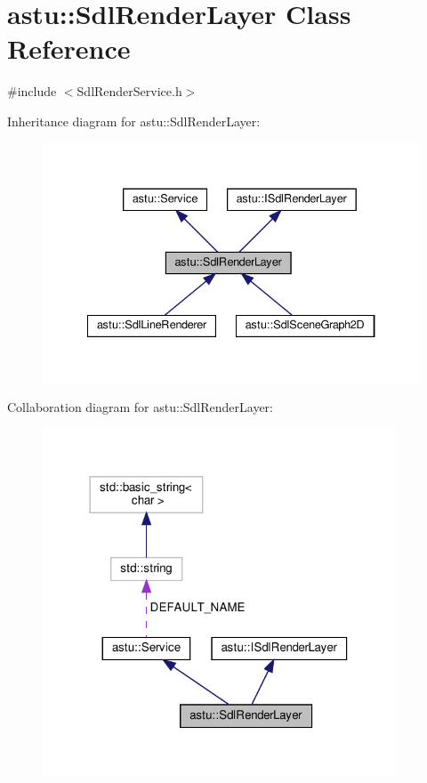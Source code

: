 \hypertarget{classastu_1_1SdlRenderLayer}{}\section{astu\+:\+:Sdl\+Render\+Layer Class Reference}
\label{classastu_1_1SdlRenderLayer}


{\ttfamily \#include $<$Sdl\+Render\+Service.\+h$>$}



Inheritance diagram for astu\+:\+:Sdl\+Render\+Layer\+:\nopagebreak
\begin{figure}[H]
\begin{center}
\leavevmode
\includegraphics[width=334pt]{classastu_1_1SdlRenderLayer__inherit__graph}
\end{center}
\end{figure}


Collaboration diagram for astu\+:\+:Sdl\+Render\+Layer\+:\nopagebreak
\begin{figure}[H]
\begin{center}
\leavevmode
\includegraphics[width=297pt]{classastu_1_1SdlRenderLayer__coll__graph}
\end{center}
\end{figure}
